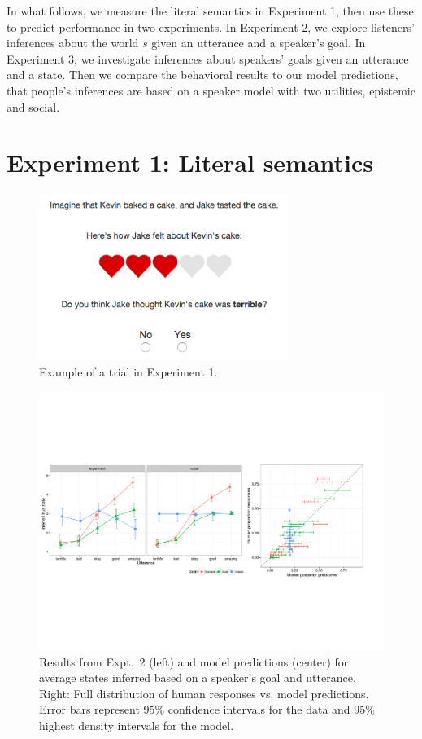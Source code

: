 \documentclass[10pt,letterpaper]{article}
\begin{document}
In what follows, we measure the literal semantics in Experiment 1, then use these to predict performance in two experiments. In Experiment 2, we explore listeners' inferences about the world $s$ given an utterance and a speaker's goal. In Experiment 3, we investigate inferences about speakers' goals given an utterance and a state. 
Then we compare the behavioral results to our model predictions, that people's inferences are based on a speaker model with two utilities, epistemic and social. 

\section{Experiment 1: Literal semantics}

\begin{figure}[th]
\begin{centering}
\includegraphics[width=3.2in]{figures/example.png}
\caption{\label{fig:ex} Example of a trial in Experiment 1.}
\end{centering}
\end{figure}


\begin{figure}[b]
\begin{centering}
\includegraphics[width=\textwidth]{figures/exp2.pdf}
\caption{\label{fig:exp2} Results from Expt.~2 (left) and model predictions (center) for average states inferred based on a speaker's goal and utterance. Right: Full distribution of human responses vs. model predictions. Error bars represent 95\% confidence intervals for the data and 95\% highest density intervals for the model.}
\end{centering}
\end{figure}
\end{document}
